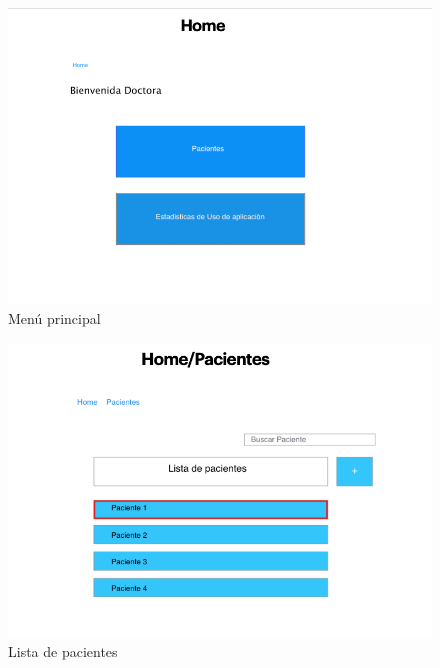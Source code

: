 \documentclass[12pt]{article}
\begin{document}
\begin{figure}[ht]
\centering
\includegraphics[scale=0.4]{imag/P3.png}
\caption{Menú principal }
\label{6}
\end{figure}
\FloatBarrier


\begin{figure}[ht]
\centering
\includegraphics[scale=0.4]{imag/P4.png}
\caption{Lista de pacientes }
\label{6}
\end{figure}
\FloatBarrier
\end{document}
